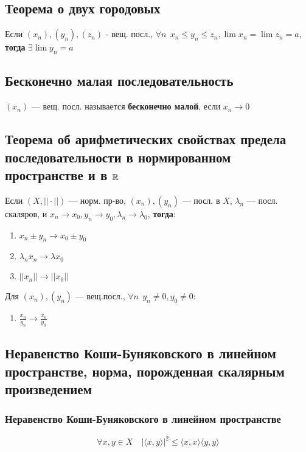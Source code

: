 \subsection{Теорема о двух городовых}

Если $(x_n),(y_n),(z_n)$ - вещ. посл., $\forall n \ \ x_n\leq y_n\leq z_n, \lim x_n=\lim z_n =a$, \textbf{тогда} $\exists \lim y_n=a$

\subsection{Бесконечно малая последовательность}

$(x_n)$ --- вещ. посл. называется \textbf{бесконечно малой}, если $x_n\to 0$

\subsection{Теорема об арифметических свойствах предела последовательности в нормированном пространстве и в $\operatorname*{\mathbb{R}}$}

Если $(X, ||\cdot||)$ --- норм. пр-во, $(x_n),(y_n)$ --- посл. в $X$, $\lambda_n$ ---
посл. скаляров, и $x_n\to x_0, y_n\to y_0, \lambda_n\to \lambda_0$, \textbf{тогда}:
\begin{enumerate}
\item $x_n\pm y_n\to x_0\pm y_0$
\item $\lambda_nx_n\to \lambda x_0$
\item $||x_n||\to||x_0||$
\end{enumerate}

Для $(x_n),(y_n)$ 
--- вещ.посл., $\forall n \ \ y_n\not =0, y_0\not = 0$:
\begin{enumerate}[resume]
\item $\frac{x_n}{y_n}\to\frac{x_0}{y_0}$
\end{enumerate}

\subsection{Неравенство Коши-Буняковского в линейном пространстве, норма, порожденная скалярным произведением}

\subsubsection{Неравенство Коши-Буняковского в линейном пространстве}
$$\forall x,y\in X\quad |\langle x,y\rangle|^2\leq \langle x,x\rangle \langle y,y\rangle$$

